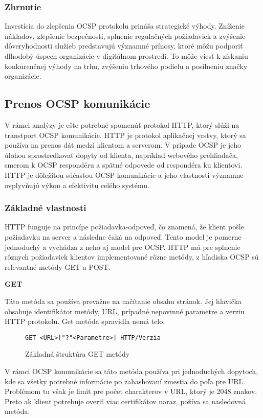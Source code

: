\documentclass[12pt, twoside]{book}
\newcommand{\subsubsubsection}[1]{%
  \vspace{0.2em}  
  \textbf{#1} \\[0.2em]
  \hspace*{\parindent}
}
\begin{document}
\subsubsection{Zhrnutie}
Investícia do zlepšenia OCSP protokolu prináša strategické výhody. Zníženie nákladov, zlepšenie bezpečnosti, splnenie regulačných požiadaviek a zvýšenie dôveryhodnosti služieb predstavujú významné prínosy, ktoré môžu podporiť dlhodobý úspech organizácie v digitálnom prostredí. To môže viesť k získaniu konkurenčnej výhody na trhu, zvýšeniu trhového podielu a posilneniu značky organizácie.


\subsection{Prenos OCSP komunikácie}
V rámci analýzy je ešte potrebné spomenúť protokol HTTP, ktorý slúži na transtport OCSP komunikácie. HTTP je protokol aplikačnej vrstvy, ktorý sa používa na prenos dát medzi klientom a serverom. V prípade OCSP je jeho úlohou sprostredkovať dopyty od klienta, napríklad webového prehliadača, smerom k OCSP respondéru a spätné odpovede od respondéra ku klientovi. HTTP je dôležitou súčasťou OCSP komunikácie a jeho vlastnosti významne ovplyvňujú výkon a efektivitu celého systému.

\subsubsection{Základné vlastnosti}
HTTP funguje na princípe požiadavka-odpoveď, čo znamená, že klient pošle požiadavku na server a následne čaká na odpoveď. Tento model je pomerne jednoduchý a vychádza z neho aj model pre OCSP. HTTP má pre splnenie rôznych požiadaviek klientov implementované rôzne metódy, z hľadiska OCSP sú relevantné metódy GET a POST.

\subsubsubsection{GET}
Táto metóda sa používa prevažne na načítanie obsahu stránok. Jej hlavička obsahuje identifikátor metódy, URL, prípadné nepovinné parametre a verziu HTTP protokolu. Get metóda spravidla nemá telo.

\begin{figure}[H]
\begin{lstlisting}
GET <URL>["?"<Parametre>] HTTP/Verzia
\end{lstlisting}
\caption{Základná štruktúra GET metódy}
\end{figure}

V rámci OCSP komunikácie sa táto metóda používa pri jednoduchých dopytoch, kde sa všetky potrebné informácie po zahashovaní zmestia do poľa pre URL. Problémom tu však je limit pre počet charakterov v URL, ktorý je 2048 znakov. Preto ak klient potrebuje overiť viac certifikátov naraz, požíva sa nasledovná metóda.
\end{document}
